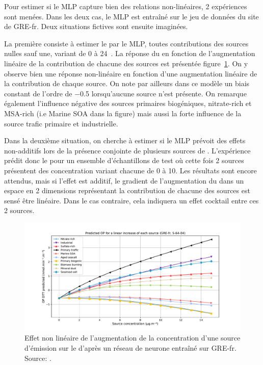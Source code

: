 Pour estimer si le MLP capture bien des relations non-linéaires, 2 expériences sont menées.
Dans les deux cas, le MLP est entraîné sur le jeu de données du site de GRE-fr. Deux
situations fictives sont ensuite imaginées.

La première consiste à estimer le \PODTTv{} par le MLP, toutes contributions des sources
nulles sauf une, variant de 0 à 24~\si{\ugm}. La réponse du \PODTTv{} en fonction de
l'augmentation linéaire de la contribution de chacune des sources est présentée
figure~\ref{fig:figures/chapter05/10sourcesLinearite}. On y observe bien une réponse
non-linéaire en fonction d'une augmentation linéaire de la contribution de
chaque source. On note par ailleurs dans ce modèle un biais constant de l'ordre de
\SI{-0.5}{\opv} lorsqu'aucune source n'est présente.
On remarque également l'influence négative des sources primaires biogéniques, nitrate-rich
et MSA-rich (i.e Marine SOA dans la figure) mais aussi la forte influence de la source
trafic primaire et industrielle.

Dans la deuxième situation, on cherche à estimer si le MLP prévoit des effets non-additifs
lors de la présence conjointe de plusieurs sources de \PMdix. L'expérience prédit donc le
\PODTTv{} pour un ensemble d'échantillons de test où cette fois 2 sources présentent des
concentration variant chacune de 0 à \SI{10}{\ugm}. Les résultats sont encore attendus,
mais si l'effet est additif, le gradient de l'augmentation du \PODTTv{} dans un espace en
2 dimensions représentant la contribution de chacune des sources est sensé être linéaire.
Dans le cas contraire, cela indiquera un effet cocktail entre ces 2 sources.

\begin{figure}[ht]
    \centering
    \includegraphics[width=0.8\linewidth]{figures/chapter05/prediction_other_0_softplus-64-0.4.pdf}
    \caption{Effet non linéaire de l'augmentation de la concentration d'une source
        d'émission sur le \PODTTv{} d'après un réseau de neurone entraîné sur GRE-fr. Source: \cite{fichesMachine2020}.}%
    \label{fig:figures/chapter05/10sourcesLinearite}
\end{figure}

